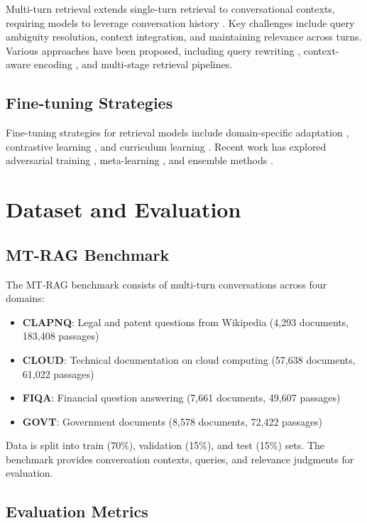 \documentclass[11pt]{article}
\begin{document}
Multi-turn retrieval extends single-turn retrieval to conversational contexts, requiring models to leverage conversation history \cite{multirag2024}. Key challenges include query ambiguity resolution, context integration, and maintaining relevance across turns. Various approaches have been proposed, including query rewriting \cite{wu2023queryrewrite}, context-aware encoding \cite{conversationaware}, and multi-stage retrieval pipelines.

\subsection{Fine-tuning Strategies}

Fine-tuning strategies for retrieval models include domain-specific adaptation \cite{domainadapt}, contrastive learning \cite{contrastive}, and curriculum learning \cite{curriculum}. Recent work has explored adversarial training \cite{adversarial}, meta-learning \cite{metalearning}, and ensemble methods \cite{ensemble}.

\section{Dataset and Evaluation}

\subsection{MT-RAG Benchmark}

The MT-RAG benchmark consists of multi-turn conversations across four domains:

\begin{itemize}
    \item \textbf{CLAPNQ}: Legal and patent questions from Wikipedia (4,293 documents, 183,408 passages)
    \item \textbf{CLOUD}: Technical documentation on cloud computing (57,638 documents, 61,022 passages)
    \item \textbf{FIQA}: Financial question answering (7,661 documents, 49,607 passages)
    \item \textbf{GOVT}: Government documents (8,578 documents, 72,422 passages)
\end{itemize}

Data is split into train (70\%), validation (15\%), and test (15\%) sets. The benchmark provides conversation contexts, queries, and relevance judgments for evaluation.

\subsection{Evaluation Metrics}
\end{document}
